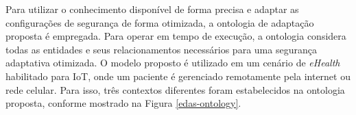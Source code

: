 \documentclass[tid,table]{texufpel} %
\begin{document}

Para utilizar o conhecimento disponível de forma precisa e adaptar as configurações de segurança de forma otimizada, a ontologia de adaptação proposta é empregada. Para operar em tempo de execução, a ontologia considera todas as entidades e seus relacionamentos necessários para uma segurança adaptativa otimizada. O modelo proposto é utilizado em um cenário de \textit{eHealth} habilitado para IoT, onde um paciente é gerenciado remotamente pela internet ou rede celular. Para isso, três contextos diferentes foram estabelecidos na ontologia proposta, conforme mostrado na Figura \ref{edas-ontology}.
\end{document}
